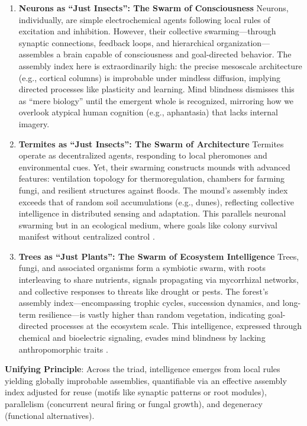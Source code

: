 \documentclass{article}
\begin{document}
\begin{enumerate}
    \item \textbf{Neurons as ``Just Insects'': The Swarm of Consciousness} Neurons, individually, are simple electrochemical agents following local rules of excitation and inhibition. However, their collective swarming---through synaptic connections, feedback loops, and hierarchical organization---assembles a brain capable of consciousness and goal-directed behavior. The assembly index here is extraordinarily high: the precise mesoscale architecture (e.g., cortical columns) is improbable under mindless diffusion, implying directed processes like plasticity and learning. Mind blindness dismisses this as ``mere biology'' until the emergent whole is recognized, mirroring how we overlook atypical human cognition (e.g., aphantasia) that lacks internal imagery.
    \item \textbf{Termites as ``Just Insects'': The Swarm of Architecture} Termites operate as decentralized agents, responding to local pheromones and environmental cues. Yet, their swarming constructs mounds with advanced features: ventilation topology for thermoregulation, chambers for farming fungi, and resilient structures against floods. The mound’s assembly index exceeds that of random soil accumulations (e.g., dunes), reflecting collective intelligence in distributed sensing and adaptation. This parallels neuronal swarming but in an ecological medium, where goals like colony survival manifest without centralized control \citep{turner2000,camazine2001}.
    \item \textbf{Trees as ``Just Plants'': The Swarm of Ecosystem Intelligence} Trees, fungi, and associated organisms form a symbiotic swarm, with roots interleaving to share nutrients, signals propagating via mycorrhizal networks, and collective responses to threats like drought or pests. The forest’s assembly index---encompassing trophic cycles, succession dynamics, and long-term resilience---is vastly higher than random vegetation, indicating goal-directed processes at the ecosystem scale. This intelligence, expressed through chemical and bioelectric signaling, evades mind blindness by lacking anthropomorphic traits \citep{levin2019}.
\end{enumerate}

\textbf{Unifying Principle}: Across the triad, intelligence emerges from local rules yielding globally improbable assemblies, quantifiable via an effective assembly index adjusted for reuse (motifs like synaptic patterns or root modules), parallelism (concurrent neural firing or fungal growth), and degeneracy (functional alternatives).
\end{document}
